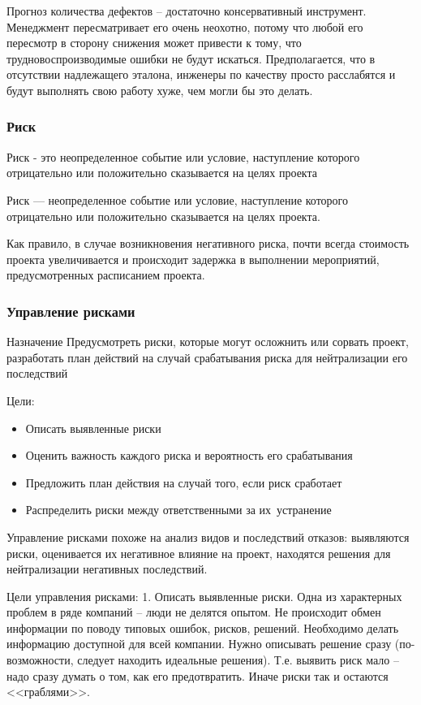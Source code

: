 \documentclass{../industrial-development}
\begin{document}
Прогноз количества дефектов – достаточно консервативный инструмент. Менеджмент пересматривает его очень неохотно, потому что любой его пересмотр в сторону снижения может привести к тому, что трудновоспроизводимые ошибки не будут искаться. Предполагается, что в отсутствии надлежащего эталона, инженеры по качеству просто расслабятся и будут выполнять свою работу хуже, чем могли бы это делать.

\begin{frame} \frametitle{Риск}
    \begin{definition}
        \alert{Риск} - это \alert{неопределенное} событие или условие, наступление которого отрицательно или положительно сказывается на целях проекта
    \end{definition}
\end{frame}
\lecturenotes

Риск — неопределенное событие или условие, наступление которого отрицательно или положительно сказывается на целях проекта.

Как правило, в случае возникновения негативного риска, почти всегда стоимость проекта увеличивается и происходит задержка в выполнении мероприятий, предусмотренных расписанием проекта.

\begin{frame} \frametitle{Управление рисками}
	\begin{block}{Назначение}
		Предусмотреть риски, которые могут осложнить или сорвать проект, разработать план действий на случай срабатывания риска для нейтрализации его последствий
	\end{block}
	Цели:
	\begin{itemize}
		\item Описать выявленные риски
		\item Оценить важность каждого риска и вероятность его срабатывания
		\item Предложить план действия на случай того, если риск сработает
		\item Распределить риски между ответственными за их~устранение
	\end{itemize}
\end{frame}
\lecturenotes

Управление рисками похоже на анализ видов и последствий отказов: выявляются риски, оценивается их негативное влияние на проект, находятся решения для нейтрализации негативных последствий.

Цели управления рисками:
1. Описать выявленные риски.
Одна из характерных проблем в ряде компаний – люди не делятся опытом. Не происходит обмен информации по поводу типовых ошибок, рисков, решений. Необходимо делать информацию доступной для всей компании.
Нужно описывать решение сразу (по-возможности, следует находить идеальные решения). Т.е. выявить риск мало – надо сразу думать о том, как его предотвратить. Иначе риски так и остаются <<граблями>>.
\end{document}
